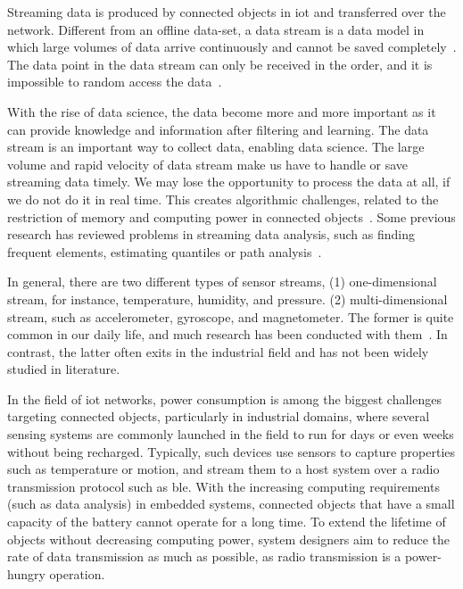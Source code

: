 Streaming data is produced by connected objects in \acrshort{iot} and
transferred over the network. Different from an offline data-set, a data stream
is a data model in which large volumes of data arrive continuously and cannot be
saved completely~\cite{o2002streaming}. The data point in the data stream can
only be received in the order, and it is impossible to random access the
data~\cite{o2002streaming}.

With the rise of data science, the data become more and more important as it can
provide knowledge and information after filtering and learning. The data stream
is an important way to collect data, enabling data science. The large volume and
rapid velocity of data stream make us have to handle or save streaming data
timely. We may lose the opportunity to process the data at all, if we do not do
it in real time. This creates algorithmic challenges, related to the restriction
of memory and computing power in connected objects~\cite{o2002streaming}. Some
previous research has reviewed problems in streaming data analysis, such as
finding frequent elements, estimating quantiles or path
analysis~\cite{kejariwal2015real}.

In general, there are two different types of sensor streams, (1) one-dimensional
stream, for instance, temperature, humidity, and pressure. (2) multi-dimensional
stream, such as accelerometer, gyroscope, and magnetometer. The former is quite
common in our daily life, and much research has been conducted with
them~\cite{kulwicki1991humidity, oprea2009temperature, woyessa2016temperature}.
In contrast, the latter often exits in the industrial field and has not been
widely studied in literature.





In the field of \acrshort{iot} networks, power consumption is among the biggest
challenges targeting connected objects, particularly in industrial domains,
where several sensing systems are commonly launched in the field to run for days
or even weeks without being recharged. Typically, such devices use sensors to
capture properties such as temperature or motion, and stream them to a host
system over a radio transmission protocol such as \acrfull{ble}. With the
increasing computing requirements (such as data analysis) in embedded systems,
connected objects that have a small capacity of the battery cannot operate for a
long time. To extend the lifetime of objects without decreasing computing power,
system designers aim to reduce the rate of data transmission as much as
possible, as radio transmission is a power-hungry operation.


